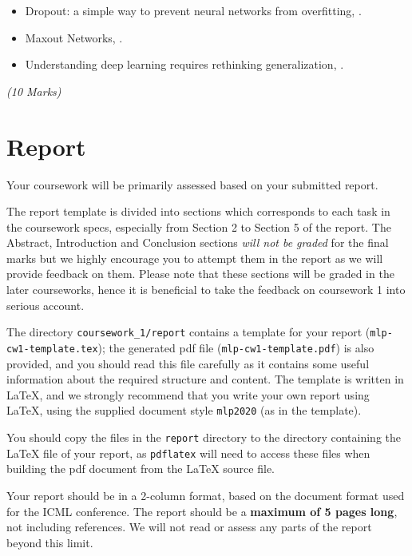 \documentclass[11pt,]{article}
\begin{document}

\begin{itemize} 
    \item Dropout: a simple way to prevent neural networks from overfitting, \cite{srivastava2014dropout}.
    \item Maxout Networks, \cite{goodfellow2013maxout}.
    \item Understanding deep learning requires rethinking generalization, \cite{zhang2016understanding}.
\end{itemize}

\emph{(10 Marks)}

\section{Report}
\label{sec:report}
Your coursework will be primarily assessed based on your submitted report. 

The report template is divided into sections which corresponds to each task in the coursework specs, especially from Section 2 to Section 5 of the report. The Abstract, Introduction and Conclusion sections \textit{will not be graded} for the final marks but we highly encourage you to attempt them in the report as we will provide feedback on them. Please note that these sections will be graded in the later courseworks, hence it is beneficial to take the feedback on coursework 1 into serious account.


The directory \verb+coursework_1/report+ contains a template for your report (\verb+mlp-cw1-template.tex+);  the generated pdf file (\verb+mlp-cw1-template.pdf+) is also provided, and you should read this file carefully as it contains some useful information about the required structure and content. The template is written in LaTeX, and we strongly recommend that you write your own report using LaTeX, using the supplied document style \verb+mlp2020+ (as in the template).

You should copy the files in the \verb+report+ directory to the directory containing the LaTeX file of your report, as \verb+pdflatex+ will need to access these files when building the pdf document from the LaTeX source file.

Your report should be in a 2-column format, based on the document format used for the ICML conference. The report should be a \textbf{maximum of 5 pages long}, not including references.  We will not read or assess any parts of the report beyond this limit.
\end{document}
